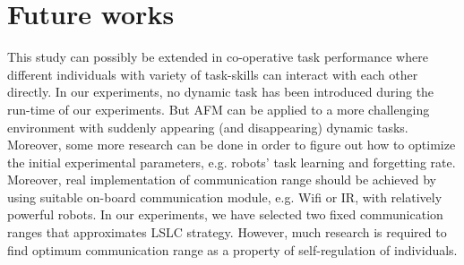 \documentclass{intech}
\begin{document}
\section{Future works}
This study can possibly be extended in co-operative task performance where different individuals with variety of task-skills can interact with each other directly. In our experiments, no dynamic task has been introduced during the run-time of our experiments. But AFM can be applied to a more challenging environment with suddenly appearing (and disappearing) dynamic tasks. Moreover, some more research can be done in order to figure out how to optimize the initial experimental parameters, e.g. robots' task learning and forgetting rate. Moreover, real implementation of communication range should be achieved by using suitable on-board communication module, e.g. Wifi or IR, with  relatively powerful robots. In our experiments, we have selected two fixed communication ranges that approximates LSLC strategy. However, much research is required to find optimum communication range as a property of self-regulation of individuals. %
 
\end{document}
